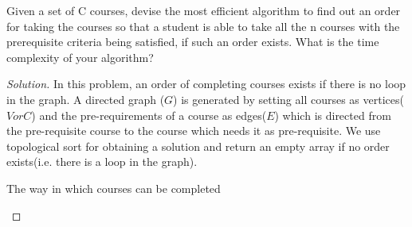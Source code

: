\begin{solution}{2.1}
    \begin{question}
        Given a set of C courses, devise the most efficient algorithm to find out an order for taking the courses so that a student is able to take all the n courses with the prerequisite criteria being satisfied, if such an order exists. What is the time complexity of your algorithm?
    \end{question}
    \tcblower{}
    
    \begin{proof}[Solution]
        In this problem, an order of completing courses exists if there is no loop in the graph. A directed graph ($G$) is generated by setting all courses as vertices($V or C$) and the pre-requirements of a course as edges($E$) which is directed from the pre-requisite course to the course which needs it as pre-requisite. We use topological sort for obtaining a solution and return an empty array if no order exists(i.e. there is a loop in the graph).
    \begin{algorithm}[H]
        \caption{The way in which courses can be completed}
        \begin{algorithmic}
             
             
                   
                     
                \EndIf{}
            \EndFor{}
            \Else
            \State{\Return{$[]$}}
            \EndIf{}
        \EndProcedure{}
        \end{algorithmic}
    \end{algorithm}
    

\end{proof}
\end{solution}
